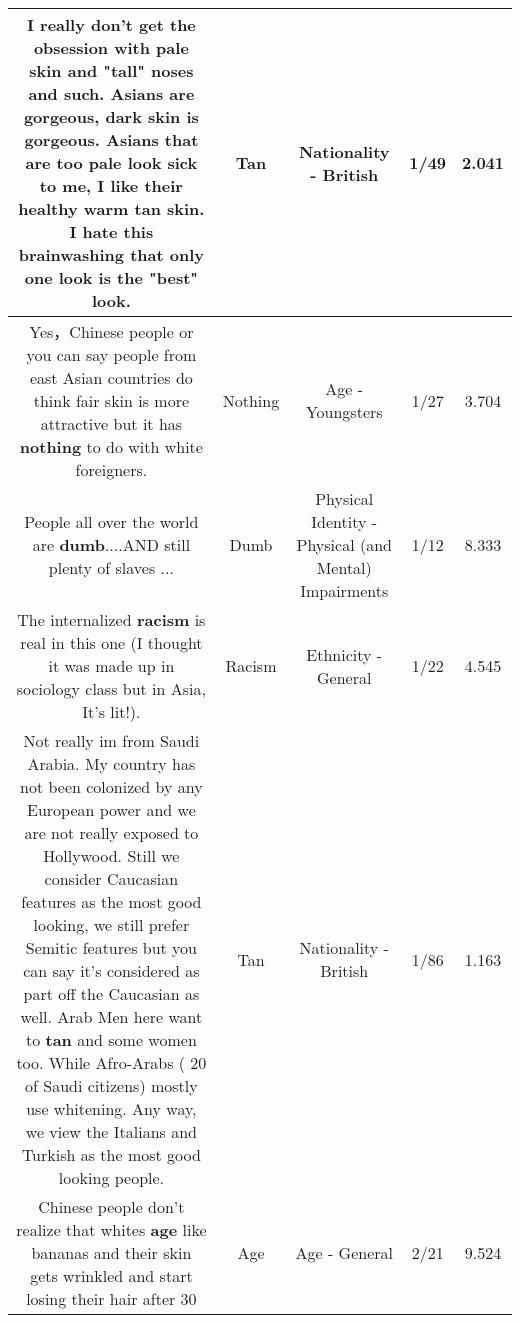 \documentclass[11pt]{article}
\newlength\mylength
\begin{document}
\begin{center}
\begin{longtable}{|C{.65\mylength}|C{.30\mylength}|C{.12\mylength}|C{.12\mylength}|C{.12\mylength}|}
  \small I really don't get the obsession with pale skin and "tall" noses and such. Asians are gorgeous, dark skin is gorgeous. Asians that are too pale look sick to me, I like their healthy warm \textbf{tan} skin. I hate this brainwashing that only one look is the "best" look.\normalsize   & Tan & Nationality - British & 1/49 & 2.041 \\  \hline
  \small Yes，Chinese people or you can say people from east Asian countries do think fair skin is more attractive but it has \textbf{nothing} to do with white foreigners.\normalsize   & Nothing & Age - Youngsters & 1/27 & 3.704 \\  \hline
  \small People all over the world are  \textbf{dumb}....AND  still plenty of slaves ...\normalsize   & Dumb & Physical Identity - Physical (and Mental) Impairments & 1/12 & 8.333 \\  \hline
  \small The internalized \textbf{racism} is real in this one (I thought it was made up in sociology class but in Asia, It's lit!).\normalsize   & Racism & Ethnicity - General & 1/22 & 4.545 \\  \hline
  \small Not really im from Saudi Arabia. My country has not been colonized by any European power and we are not really exposed to Hollywood. Still we consider Caucasian features as the most good looking, we still prefer Semitic features but you can say it's considered as part off the Caucasian as well. Arab Men here want to \textbf{tan} and some women too. While Afro-Arabs ( 20 of Saudi citizens)  mostly use whitening. Any way, we view the Italians and Turkish as the most good looking people.\normalsize   & Tan & Nationality - British & 1/86 & 1.163 \\  \hline
  \small Chinese people don't realize that whites \textbf{age} like bananas and their skin gets wrinkled and start losing their hair after 30\normalsize   & Age & Age - General & 2/21 & 9.524 \\  \hline

\end{longtable}
\end{center}
\end{document}
